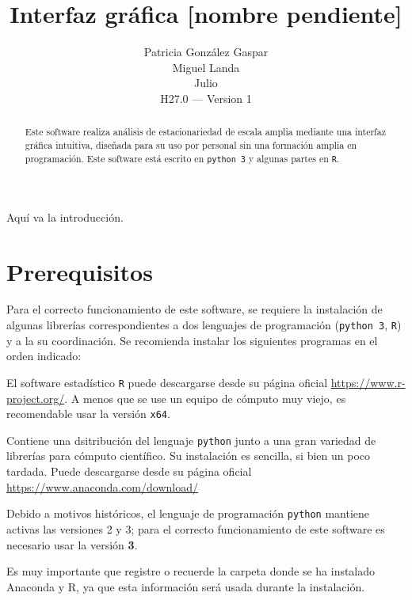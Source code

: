 \documentclass[twoside,a4paper]{refart}
\title{Interfaz gráfica [nombre pendiente]}
\author{Patricia González Gaspar\\
Miguel Landa\\
Julio\\
H27.0 --- Version 1}
\date{}
\begin{document}
\maketitle

\begin{abstract}
    Este software realiza análisis de estacionariedad de escala amplia
    mediante una interfaz gráfica intuitiva, diseñada para su uso por
    personal sin una formación amplia en programación.
    Este software está escrito en \texttt{python 3} y algunas partes en \texttt{R}. 
\end{abstract}


Aquí va la introducción.

\tableofcontents

\newpage


\section{Prerequisitos}

Para el correcto funcionamiento de este software, se requiere la instalación de algunas 
librerías correspondientes a dos lenguajes de programación (\texttt{python 3}, \texttt{R})
y a la su coordinación.
%
Se recomienda instalar los siguientes programas en el orden indicado:

El software estadístico \texttt{R} puede descargarse desde su página oficial \url{https://www.r-project.org/}. 
%
A menos que se use un equipo de cómputo muy viejo, es recomendable usar la versión 
\texttt{x64}.

Contiene una dsitribución del lenguaje \texttt{python} junto a una gran variedad de
librerías para cómputo científico.
%
Su instalación es sencilla, si bien un poco tardada.
%
Puede descargarse desde su página oficial \url{https://www.anaconda.com/download/}

\attention
Debido a motivos históricos, el lenguaje de programación \texttt{python} mantiene activas
las versiones 2 y 3; para el correcto funcionamiento de este software es necesario usar
la versión \textbf{3}.
\nopagebreak
\begin{maxipage}
Es muy importante que registre o recuerde la carpeta donde se ha instalado Anaconda y R, ya
que esta información será usada durante la instalación.
\end{maxipage}\nopagebreak
\end{document}
